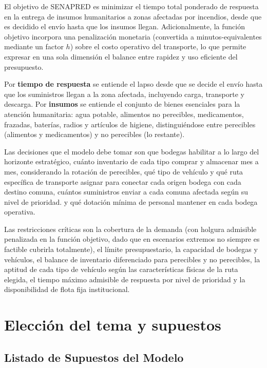 \documentclass[letterpaper]{article}
\begin{document}
\begin{flushleft}
El objetivo de SENAPRED es minimizar el tiempo total ponderado de respuesta en la entrega de insumos humanitarios a zonas afectadas por incendios, desde que es decidido el envío hasta que los insumos llegan. Adicionalmente, la función objetivo incorpora una penalización monetaria (convertida a minutos-equivalentes mediante un factor $h$) sobre el costo operativo del transporte, lo que permite expresar en una sola dimensión el balance entre rapidez y uso eficiente del presupuesto.

Por \textbf{tiempo de respuesta} se entiende el lapso desde que se decide el envío hasta que los suministros llegan a la zona afectada, incluyendo carga, transporte y descarga. Por \textbf{insumos} se entiende el conjunto de bienes esenciales para la atención humanitaria: agua potable, alimentos no perecibles, medicamentos, frazadas, baterías, radios y artículos de higiene, distinguiéndose entre perecibles (alimentos y medicamentos) y no perecibles (lo restante).

Las decisiones que el modelo debe tomar son que bodegas habilitar a lo largo del horizonte estrat\'egico, cu\'anto inventario de cada tipo comprar y almacenar mes a mes, considerando la rotaci\'on de perecibles, qu\'e tipo de veh\'iculo y qu\'e ruta espec\'ifica de transporte asignar para conectar cada origen bodega con cada destino comuna, cu\'antos suministros enviar a cada comuna afectada seg\'un su nivel de prioridad.
y qu\'e dotaci\'on m\'inima de personal mantener en cada bodega operativa.


Las restricciones cr\'iticas son la cobertura de la demanda (con holgura admisible penalizada en la funci\'on objetivo, dado que en escenarios extremos no siempre es factible cubrirla totalmente), el l\'imite presupuestario, la capacidad de bodegas y veh\'iculos, el balance de inventario diferenciado para perecibles y no perecibles, la aptitud de cada tipo de veh\'iculo seg\'un las caracter\'isticas f\'isicas de la ruta elegida, el tiempo m\'aximo admisible de respuesta por nivel de prioridad y la disponibilidad de flota fija institucional.

\section{Elección del tema y supuestos}

\subsection{Listado de Supuestos del Modelo}


\end{flushleft}
\end{document}
